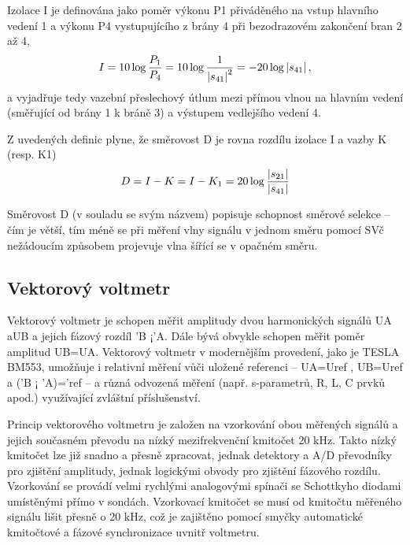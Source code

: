         Izolace I je definována jako poměr výkonu P1 přiváděného na vstup hlavního vedení 1 a výkonu P4 
        vystupujícího z brány 4 při bezodrazovém zakončení bran 2 až 4,
        \begin{equation}\label{RA:eq_smith13}
          I = 10\log\frac{P_1}{P_4} 
            = 10\log\frac{1}{\left\lvert s_{41}\right\rvert^2} = -20\log\left\lvert s_{41}\right\rvert, 
        \end{equation} 
        a vyjadřuje tedy vazební přeslechový útlum mezi přímou vlnou na hlavním vedení (směřující od brány 1 
        k bráně 3) a výstupem vedlejšího vedení 4.
  
        Z uvedených definic plyne, že směrovost D je rovna rozdílu izolace I a vazby K (resp. K1)
        \begin{equation}\label{RA:eq_smith14}
          D = I - K = I - K_1 = 20\log\frac{\left\lvert s_{21}\right\rvert}{\left\lvert s_{41}\right\rvert}
        \end{equation}  
  
        Směrovost D (v souladu se svým názvem) popisuje schopnost směrové selekce – čím je větší, tím méně se 
        při měření vlny signálu v jednom směru pomocí SVč nežádoucím způsobem projevuje vlna šířící se v 
        opačném směru.
  
      \subsection{Vektorový voltmetr}
        Vektorový voltmetr je schopen měřit amplitudy dvou harmonických signálů UA aUB a jejich fázový rozdíl 
        'B ¡'A. Dále bývá obvykle schopen měřit poměr amplitud UB=UA. Vektorový voltmetr v modernějším 
        provedení, jako je TESLA BM553, umožňuje i relativní měření vůči uložené referenci – UA=Uref , 
        UB=Uref a ('B ¡ 'A)='ref – a různá odvozená měření (např. s-parametrů, R, L, C prvků apod.) 
        využívající zvláštní příslušenství.
  
        Princip vektorového voltmetru je založen na vzorkování obou měřených signálů a jejich současném 
        převodu na nízký mezifrekvenční kmitočet 20 kHz. Takto nízký kmitočet lze již snadno a přesně 
        zpracovat, jednak detektory a A/D převodníky pro zjištění amplitudy, jednak logickými obvody pro 
        zjištění fázového rozdílu. Vzorkování se provádí velmi rychlými analogovými spínači se Schottkyho 
        diodami umístěnými přímo v sondách. Vzorkovací kmitočet se musí od kmitočtu měřeného signálu lišit 
        přesně o 20 kHz, což je zajištěno pomocí smyčky automatické kmitočtové a fázové synchronizace uvnitř 
        voltmetru.
  
  


      

  
\printbibliography[heading=subbibliography]